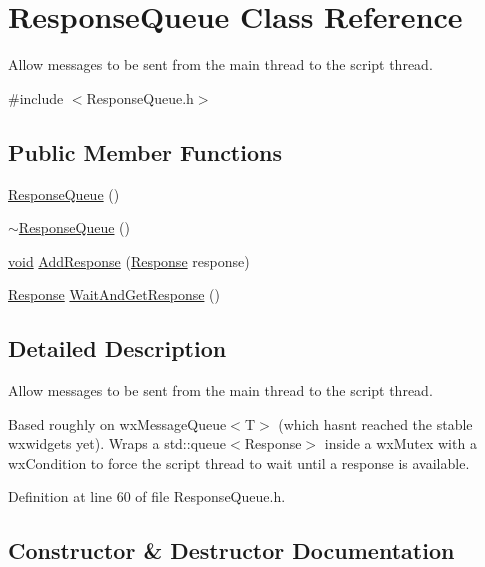 \hypertarget{class_response_queue}{}\section{Response\+Queue Class Reference}
\label{class_response_queue}


Allow messages to be sent from the main thread to the script thread.  




{\ttfamily \#include $<$Response\+Queue.\+h$>$}

\subsection*{Public Member Functions}
\begin{DoxyCompactItemize}
\item 
\hyperlink{class_response_queue_a6acc058be3b28f71dbe2b1d9f65a250d}{Response\+Queue} ()
\item 
\hyperlink{class_response_queue_a4b1b3012b04513aaf36a6b582a60e1d8}{$\sim$\+Response\+Queue} ()
\item 
\hyperlink{sound_8c_ae35f5844602719cf66324f4de2a658b3}{void} \hyperlink{class_response_queue_accc6a22344639e5f7a99cfc7849ecfb9}{Add\+Response} (\hyperlink{class_response}{Response} response)
\item 
\hyperlink{class_response}{Response} \hyperlink{class_response_queue_a8eb005e3679ec3f27db23bfeccb52a07}{Wait\+And\+Get\+Response} ()
\end{DoxyCompactItemize}


\subsection{Detailed Description}
Allow messages to be sent from the main thread to the script thread. 

Based roughly on wx\+Message\+Queue$<$\+T$>$ (which hasn\textquotesingle{}t reached the stable wxwidgets yet). Wraps a std\+::queue$<$\+Response$>$ inside a wx\+Mutex with a wx\+Condition to force the script thread to wait until a response is available. 

Definition at line 60 of file Response\+Queue.\+h.



\subsection{Constructor \& Destructor Documentation}
